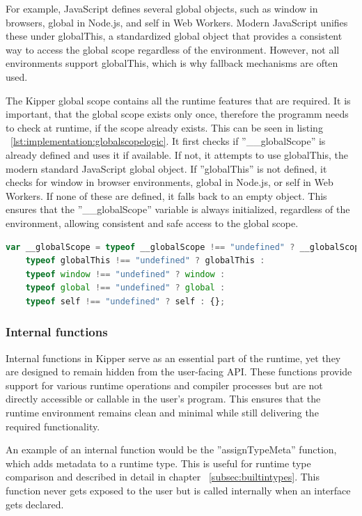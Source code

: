 For example, JavaScript defines several global objects, such as window in browsers, global in Node.js, and self in Web Workers. Modern JavaScript unifies these under globalThis, a standardized global object that provides a consistent way to access the global scope regardless of the environment. However, not all environments support globalThis, which is why fallback mechanisms are often used.

The Kipper global scope contains all the runtime features that are required. It is important, that the global scope exists only once, therefore the programm needs to check at runtime, if the scope already exists. This can be seen in listing ~\ref{lst:implementation:globalscopelogic}. It first checks if ''\_\_globalScope'' is already defined and uses it if available. If not, it attempts to use globalThis, the modern standard JavaScript global object. If ''globalThis'' is not defined, it checks for window in browser environments, global in Node.js, or self in Web Workers. If none of these are defined, it falls back to an empty object. This ensures that the ''\_\_globalScope'' variable is always initialized, regardless of the environment, allowing consistent and safe access to the global scope.

\begin{lstlisting}[language=TypeScript,caption=Global Scope Logic,label=lst:implementation:globalscopelogic]
var __globalScope = typeof __globalScope !== "undefined" ? __globalScope :
    typeof globalThis !== "undefined" ? globalThis :
    typeof window !== "undefined" ? window :
    typeof global !== "undefined" ? global :
    typeof self !== "undefined" ? self : {};
\end{lstlisting}

\subsubsection{Internal functions}
Internal functions in Kipper serve as an essential part of the runtime, yet they are designed to remain hidden from the user-facing API. These functions provide support for various runtime operations and compiler processes but are not directly accessible or callable in the user's program. This ensures that the runtime environment remains clean and minimal while still delivering the required functionality.

An example of an internal function would be the ''assignTypeMeta'' function, which adds metadata to a runtime type. This is useful for runtime type comparison and described in detail in chapter ~\ref{subsec:builtintypes}. This function never gets exposed to the user but is called internally when an interface gets declared.

